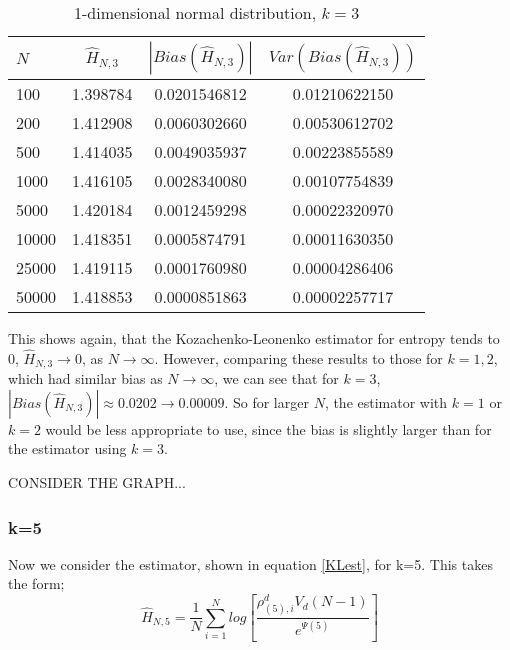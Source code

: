 \documentclass{article}
\begin{document}
\begin{table}
\caption{1-dimensional normal distribution, $k=3$} \label{normal_k=3_table}
\begin{center}
\begin{tabular}{| l | c c c|} 
\toprule
$N$ & $\hat{H}_{N, 3}$ & $|Bias(\hat{H}_{N, 3})|$ & $Var(Bias(\hat{H}_{N, 3}))$ \\
\midrule[1pt]
100     & 1.398784     & 0.0201546812     & 0.01210622150  \\
200     & 1.412908     & 0.0060302660     & 0.00530612702  \\
500     & 1.414035     & 0.0049035937     & 0.00223855589  \\
1000    & 1.416105     & 0.0028340080     & 0.00107754839  \\
5000    & 1.420184     & 0.0012459298     & 0.00022320970  \\
10000   & 1.418351     & 0.0005874791     & 0.00011630350  \\
25000   & 1.419115     & 0.0001760980     & 0.00004286406  \\
50000   & 1.418853     & 0.0000851863     & 0.00002257717  \\
\hline
\end{tabular}
\end{center}
\end{table}

This shows again, that the Kozachenko-Leonenko estimator for entropy tends to 0, $\hat{H}_{N, 3} \to 0$, as $N \to \infty$. However, comparing these results to those for $k=1, 2$, which had similar bias as $N \to \infty$, we can see that for $k=3$, $|Bias(\hat{H}_{N, 3})| \approx 0.0202 \to 0.00009$. So for larger $N$, the estimator with $k=1$ or $k=2$ would be less appropriate to use, since the bias is slightly larger than for the estimator using $k=3$.

CONSIDER THE GRAPH...


\subsubsection{k=5} \label{N_k=5}

Now we consider the estimator, shown in equation \ref{KLest}, for k=5. This takes the form;
\begin{equation}
\hat{H}_{N, 5} = \frac{1}{N} \sum_{i=1}^{N} log \left[ \frac{\rho_{(5),i}^{d} V_{d} (N-1)}{e^{\Psi(5)}} \right] \nonumber
\end{equation}
\end{document}
